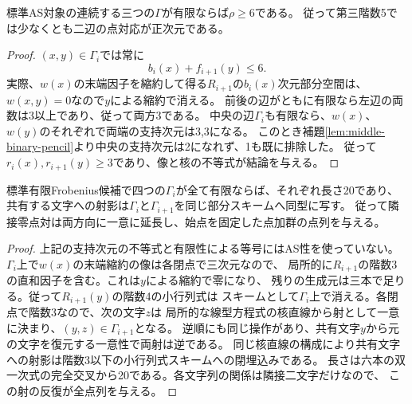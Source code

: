 \begin{proposition}[連続三辺の有限性と第三階数]\label{prop:three-finite-edges}
標準AS対象の連続する三つの$\Gamma$が有限ならば$\rho\ge6$である。
従って第三階数5では少なくとも二辺の点対応が正次元である。
\end{proposition}
\begin{proof}
$(x,y)\in\Gamma_i$では常に
\[
 b_i(x)+f_{i+1}(y)\le6 .
\]
実際、$w(x)$の末端因子を縮約して得る$R_{i+1}$の$b_i(x)$次元部分空間は、
$w(x,y)=0$なので$y$による縮約で消える。
前後の辺がともに有限なら左辺の両数は3以上であり、従って両方3である。
中央の辺$\Gamma_i$も有限なら、$w(x)$、$w(y)$のそれぞれで両端の支持次元は3,3になる。
このとき補題\ref{lem:middle-binary-pencil}より中央の支持次元は2になれず、1も既に排除した。
従って$r_i(x),r_{i+1}(y)\ge3$であり、像と核の不等式が結論を与える。
\end{proof}

\begin{corollary}[四辺が有限な場合の点列]\label{cor:finite-edge-point-sequences}
標準有限Frobenius候補で四つの$\Gamma_i$が全て有限ならば、それぞれ長さ20であり、
共有する文字への射影は$\Gamma_i$と$\Gamma_{i+1}$を同じ部分スキームへ同型に写す。
従って隣接零点対は両方向に一意に延長し、始点を固定した点加群の点列を与える。
\end{corollary}
\begin{proof}
上記の支持次元の不等式と有限性による等号にはAS性を使っていない。
$\Gamma_i$上で$w(x)$の末端縮約の像は各閉点で三次元なので、
局所的に$R_{i+1}$の階数3の直和因子を含む。これは$y$による縮約で零になり、
残りの生成元は三本で足りる。従って$R_{i+1}(y)$の階数4の小行列式は
スキームとして$\Gamma_i$上で消える。各閉点で階数3なので、次の文字$z$は
局所的な線型方程式の核直線から射として一意に決まり、$(y,z)\in\Gamma_{i+1}$となる。
逆順にも同じ操作があり、共有文字$y$から元の文字を復元する一意性で両射は逆である。
同じ核直線の構成により共有文字への射影は階数3以下の小行列式スキームへの閉埋込みである。
長さは六本の双一次式の完全交叉から20である。各文字列の関係は隣接二文字だけなので、
この射の反復が全点列を与える。
\end{proof}

